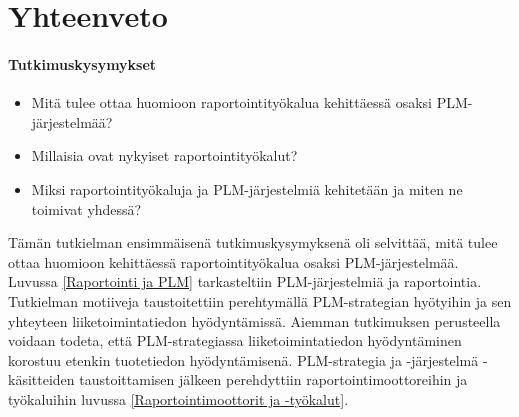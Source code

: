 \chapter{Yhteenveto} \label{Yhteenveto}

\subsubsection{Tutkimuskysymykset}
\begin{itemize}
\item Mitä tulee ottaa huomioon raportointityökalua kehittäessä osaksi PLM-järjestelmää?
\item Millaisia ovat nykyiset raportointityökalut?
\item Miksi raportointityökaluja ja PLM-järjestelmiä kehitetään ja miten ne toimivat yhdessä?
\end{itemize}


Tämän tutkielman ensimmäisenä tutkimuskysymyksenä oli selvittää, mitä tulee ottaa huomioon kehittäessä raportointityökalua osaksi PLM-järjestelmää. Luvussa \ref{Raportointi ja PLM} tarkasteltiin PLM-järjestelmiä ja raportointia. Tutkielman motiiveja taustoitettiin perehtymällä PLM-strategian hyötyihin ja sen yhteyteen liiketoimintatiedon hyödyntämissä. Aiemman tutkimuksen perusteella voidaan todeta, että PLM-strategiassa liiketoimintatiedon hyödyntäminen korostuu etenkin tuotetiedon hyödyntämisenä. \cite{bayro-corrochano_preliminary_2014} PLM-strategia ja -järjestelmä -käsitteiden taustoittamisen jälkeen perehdyttiin raportointimoottoreihin ja työkaluihin luvussa \ref{Raportointimoottorit ja -työkalut}.
